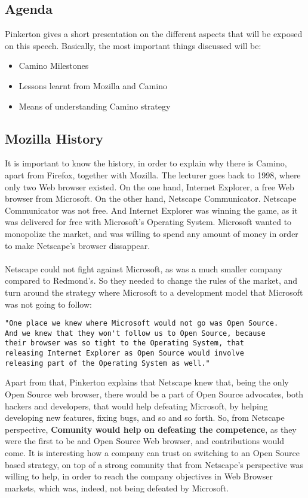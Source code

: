 \documentclass[11pt]{article}
\begin{document}
\subsection{Agenda}
Pinkerton gives a short presentation on the different aspects that will be exposed on this speech. Basically, the most important things discussed will be:
\begin{itemize}\itemsep0pt
\item{Camino Milestones}
\item{Lessons learnt from Mozilla and Camino}
\item{Means of understanding Camino strategy}
\end{itemize}

\subsection{Mozilla History}
It is important to know the history, in order to explain why there is Camino, apart from Firefox, together with Mozilla. The lecturer goes back to 1998, where only two Web browser existed. On the one hand, Internet Explorer, a free Web browser from Microsoft. On the other hand, Netscape Communicator. Netscape Communicator was not free. And Internet Explorer was winning the game, as it was delivered for free with Microsoft's Operating System. Microsoft wanted to monopolize the market, and was willing to spend any amount of money in order to make Netscape's browser dissappear.\\
\\
Netscape could not fight against Microsoft, as was a much smaller company compared to Redmond's. So they needed to change the rules of the market, and turn around the strategy where Microsoft to a development model that Microsoft was not going to follow:
\begin{verbatim}
"One place we knew where Microsoft would not go was Open Source.
And we knew that they won't follow us to Open Source, because
their browser was so tight to the Operating System, that
releasing Internet Explorer as Open Source would involve
releasing part of the Operating System as well."
\end{verbatim}
Apart from that, Pinkerton explains that Netscape knew that, being the only Open Source web browser, there would be a part of Open Source advocates, both hackers and developers, that would help defeating Microsoft, by helping developing new features, fixing bugs, and so and so forth. So, from Netscape perspective, \textbf{Comunity would help on defeating the competence}, as they were the first to be and Open Source Web browser, and contributions would come. It is interesting how a company can trust on switching to an Open Source based strategy, on top of a strong comunity that from Netscape's perspective was willing to help, in order to reach the company objectives in Web Browser markets, which was, indeed, not being defeated by Microsoft.\\
\end{document}
